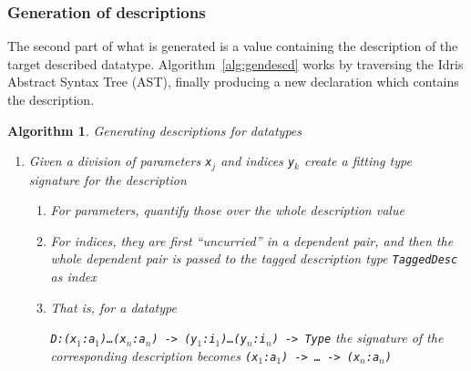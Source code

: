 \documentclass{ituthesis}
\newcommand{\tttype}[1]{\textcolor{type-color}{\texttt{#1}}}
\newcommand{\ttdec}[1]{\textcolor{declared-var-color}{\texttt{#1}}}
\newcommand{\ttvar}[1]{\textcolor{local-var-color}{\texttt{#1}}}
\theoremstyle{break}
\newtheorem{alg}{Algorithm}
\begin{document}
\subsubsection{Generation of descriptions}
\label{ssub:Generation of descriptions}
The second part of what is generated is a value containing the description of the target described datatype.
Algorithm~\ref{alg:gendescd} works by traversing the Idris Abstract Syntax Tree (AST), finally producing a new declaration which contains the description.

\begin{alg}
  Generating descriptions for datatypes
  \begin{enumerate}
    \item Given a division of parameters \ttvar{x$_j$} and indices \ttvar{y$_k$} create a fitting type signature for the description
       \begin{enumerate}
         \item For parameters, quantify those over the whole description value
         \item For indices, they are first ``uncurried'' in a dependent pair, and then the whole dependent pair is passed to the tagged description type \ttdec{TaggedDesc} as index
         \item[] That is, for a datatype
           
           \tttype{D}\texttt{:}\texttt{(}\ttvar{x$_1$}\texttt{:}\ttvar{a$_1$}\texttt{)}\texttt{\ldots}\texttt{(}\ttvar{x$_n$}\texttt{:}\ttvar{a$_n$}\texttt{)}\texttt{~->~}\texttt{(}\ttvar{y$_1$}\texttt{:}\ttvar{i$_1$}\texttt{)}\texttt{\ldots}\texttt{(}\ttvar{y$_n$}\texttt{:}\ttvar{i$_n$}\texttt{)}\texttt{~->~}\tttype{Type} the signature of the corresponding description becomes \texttt{(}\ttvar{x$_1$}\texttt{:}\ttvar{a$_1$}\texttt{)}\texttt{~->~}\texttt{\ldots}\texttt{~->~}\texttt{(}\ttvar{x$_n$}\texttt{:}\ttvar{a$_n$}\texttt{)}
           

\end{enumerate}
\end{enumerate}
\end{alg}
\end{document}
